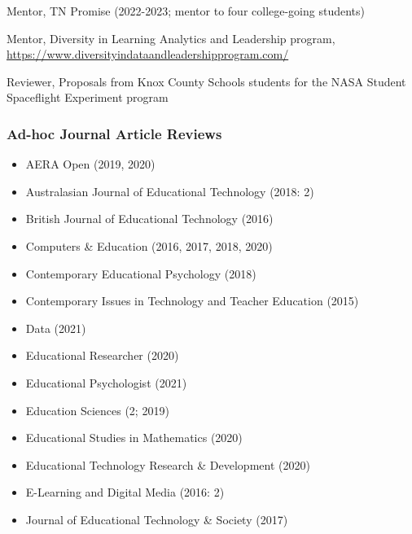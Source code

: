 \documentclass[
  14,
]{article}
\providecommand{\tightlist}{%
  \setlength{\itemsep}{0pt}\setlength{\parskip}{0pt}}
\begin{document}
Mentor, TN Promise (2022-2023; mentor to four college-going students)

Mentor, Diversity in Learning Analytics and Leadership program,
\url{https://www.diversityindataandleadershipprogram.com/}

Reviewer, Proposals from Knox County Schools students for the NASA
Student Spaceflight Experiment program

\hypertarget{ad-hoc-journal-article-reviews}{%
\subsubsection{Ad-hoc Journal Article
Reviews}\label{ad-hoc-journal-article-reviews}}

\begin{itemize}
\tightlist
\item
  AERA Open (2019, 2020)\\
\item
  Australasian Journal of Educational Technology (2018: 2)\\
\item
  British Journal of Educational Technology (2016)\\
\item
  Computers \& Education (2016, 2017, 2018, 2020)\\
\item
  Contemporary Educational Psychology (2018)\\
\item
  Contemporary Issues in Technology and Teacher Education (2015)\\
\item
  Data (2021)\\
\item
  Educational Researcher (2020)\\
\item
  Educational Psychologist (2021)\\
\item
  Education Sciences (2; 2019)\\
\item
  Educational Studies in Mathematics (2020)\\
\item
  Educational Technology Research \& Development (2020)\\
\item
  E-Learning and Digital Media (2016: 2)\\
\item
  Journal of Educational Technology \& Society (2017)\\

\end{itemize}
\end{document}
